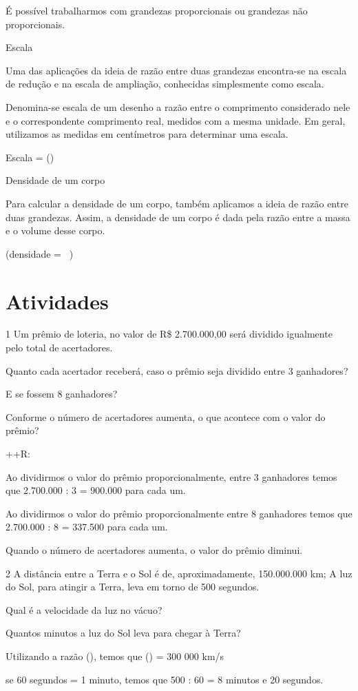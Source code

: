 {É possível trabalharmos com grandezas proporcionais ou grandezas não
proporcionais.

Escala

Uma das aplicações da ideia de razão entre duas grandezas encontra-se na
escala de redução e na escala de ampliação, conhecidas simplesmente como
escala.

Denomina-se escala de um desenho a razão entre o comprimento considerado
nele e o correspondente comprimento real, medidos com a mesma unidade.
Em geral, utilizamos as medidas em centímetros para determinar uma
escala.

Escala =
()

Densidade de um corpo

Para calcular a densidade de um corpo, também aplicamos a ideia de razão
entre duas grandezas. Assim, a densidade de um corpo é dada pela razão
entre a massa e o volume desse corpo.

(densidade = \ )

\section{Atividades}

\num{1} Um prêmio de loteria, no valor de R\$ 2.700.000,00 será dividido
igualmente pelo total de acertadores.
\item Quanto cada acertador receberá, caso o prêmio seja dividido entre 3
ganhadores?
\item E se fossem 8 ganhadores?
\item Conforme o número de acertadores aumenta, o que acontece com o valor
do prêmio?

++R:
\item Ao dividirmos o valor do prêmio proporcionalmente, entre 3 ganhadores
temos que 2.700.000 : 3 = 900.000 para cada um.
\item Ao dividirmos o valor do prêmio proporcionalmente entre 8 ganhadores
temos que 2.700.000 : 8 = 337.500 para cada um.
\item Quando o número de acertadores aumenta, o valor do prêmio diminui.

\num{2} A distância entre a Terra e o Sol é de, aproximadamente, 150.000.000
km; A luz do Sol, para atingir a Terra, leva em torno de 500 segundos.
\item Qual é a velocidade da luz no vácuo?
\item Quantos minutos a luz do Sol leva para chegar à Terra?
\item Utilizando a razão (), temos que
() = 300 000 km/s
\item se 60 segundos = 1 minuto, temos que 500 : 60 = 8 minutos e 20
segundos.

}
